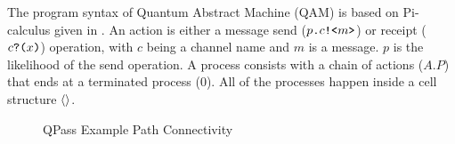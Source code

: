 The program syntax of Quantum Abstract Machine (QAM) is based on Pi-calculus given in . 
An action is either a message send ($p\texttt{.}c\texttt{!<}m\texttt{>}$) or receipt ($c\texttt{?(}x\texttt{)}$) operation,
with $c$ being a channel name and $m$ is a message. $p$ is the likelihood of the send operation.
A process consists with a chain of actions ($A.P$) that ends at a terminated process ($0$).
All of the processes happen inside a cell structure $\langle  \rangle$.


\begin{figure}[t]
{\small
\begin{center}
\end{center}
}
\caption{QPass Example Path Connectivity}
  \label{fig:q-pi-example}
\end{figure}
 
